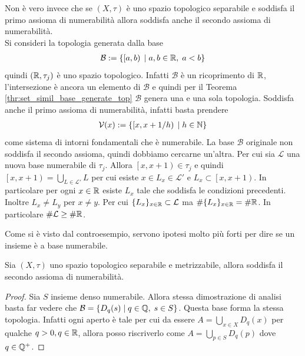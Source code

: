 \begin{remark}
	Non è vero invece che se $(X,\tau)$ è uno spazio topologico separabile e soddisfa il primo assioma di numerabilità allora soddisfa anche il secondo assioma di numerabilità. \\
	Si consideri la topologia generata dalla base
	\begin{equation}
	\begin{aligned}
		\mathcal{B} := \{ \left[a,b\right) \; | \; a,b \in \mathbb{R}, \; a < b \}
	\end{aligned}
	\end{equation}  
	quindi $(\mathbb{R}, \tau_j)$ è uno spazio topologico. Infatti $\mathcal{B}$ è un ricoprimento di $\mathbb{R}$, l'intersezione è ancora un elemento di $\mathcal{B}$ e quindi per il Teorema \ref{thr:set_simil_base_generate_top} $\mathcal{B}$ genera una e una sola topologia. Soddisfa anche il primo assioma di numerabilità, infatti basta prendere 
	\begin{equation}
	\begin{aligned}
		\mathcal{V}(x) := \{\left[x, x+1/h\right) \; | \; h \in \mathbb{N} \}
	\end{aligned}
	\end{equation}
	come sistema di intorni fondamentali che è numerabile. La base $\mathcal{B}$ originale non soddisfa il secondo assioma, quindi dobbiamo cercarne un'altra. Per cui sia $\mathcal{L}$ una nuova base numerabile di $\tau_j$. Allora $\left[x, x+1\right) \in \tau_j$ e quindi $\left[x, x+1\right) = \bigcup_{L \in \mathcal{L}'} L$ per cui esiste $x \in L_x \in \mathcal{L}'$ e $L_x \subset \left[x,x+1\right)$. In particolare per ogni $x \in \mathbb{R}$ esiste $L_x$ tale che soddisfa le condizioni precedenti. Inoltre $L_x \neq L_y$ per $x \neq y$. Per cui $ \{L_x\}_{x\in \mathbb{R}} \subset \mathcal{L}$ ma $\# \{L_x\}_{x\in \mathbb{R}} = \# \mathbb{R}$. In particolare $\# \mathcal{L} \ge \#\mathbb{R}$.
\end{remark}

Come si è visto dal controesempio, servono ipotesi molto più forti per dire se un insieme è a base numerabile.

\begin{theorem}
	Sia $(X, \tau)$ uno spazio topologico separabile e metrizzabile, allora soddisfa il secondo assioma di numerabilità.
\end{theorem}
\begin{proof}
	Sia $S$ insieme denso numerabile. Allora stessa dimostrazione di analisi basta far vedere che $\mathcal{B} = \{ D_q(s) \; | \; q \in \mathbb{Q}, \; s \in S\}$. Questa base forma la stessa topologia. Infatti ogni aperto è tale per cui da essere $A = \bigcup_{x \in X} D_q(x)$ per qualche $q > 0, q\in \mathbb{R}$, allora posso riscriverlo come $A = \bigcup_{p \in S} D_q(p)$ dove $q \in \mathbb{Q}^+$.
\end{proof}


